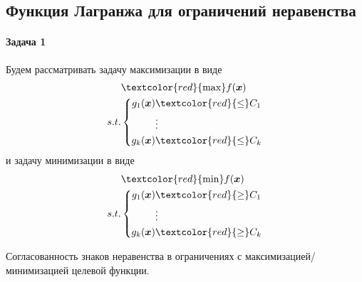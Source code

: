 \subsection{Функция Лагранжа для ограничений неравенства}

\paragraph{Задача 1}

Будем рассматривать задачу максимизации в виде
\begin{equation}\label{MaxInequalityConstraintOptmization}
	\begin{aligned} & \textcolor{red}{\max}  f(\vectx) \\ 
		s.t. & 
		\left\{\begin{aligned} g_1(\vectx) & \textcolor{red}{\leq} C_1 \\ 
		& \vdots \\ 
		g_k(\vectx) & \textcolor{red}{\leq} C_k \end{aligned}\right.
	\end{aligned} 
\end{equation}
и задачу минимизации в виде
\begin{equation}\label{MinInequalityConstraintOptmization}
	\begin{aligned} & \textcolor{red}{\min}  f(\vectx) \\ 
		 s.t. & 
		 \left\{\begin{aligned} g_1(\vectx) & \textcolor{red}{\geq} C_1 \\ 
		 & \vdots \\ 
		 g_k(\vectx) & \textcolor{red}{\geq} C_k \end{aligned}\right.
	 \end{aligned} 
\end{equation}

\begin{importante}
Согласованность знаков неравенства в ограничениях с максимизацией/минимизацией
целевой функции.
\end{importante}

